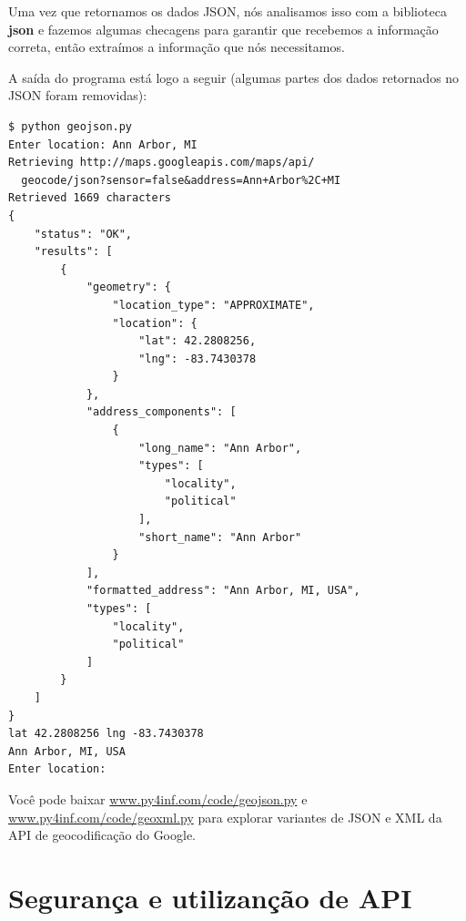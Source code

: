 Uma vez que retornamos os dados JSON, nós analisamos isso com a 
biblioteca {\bf json} e fazemos algumas checagens para garantir que 
recebemos a informação correta, então extraímos a informação que 
nós necessitamos.

A saída do programa está logo a seguir (algumas partes dos dados retornados
no JSON foram removidas):

\beforeverb
\begin{verbatim}
$ python geojson.py
Enter location: Ann Arbor, MI
Retrieving http://maps.googleapis.com/maps/api/
  geocode/json?sensor=false&address=Ann+Arbor%2C+MI
Retrieved 1669 characters
{
    "status": "OK", 
    "results": [
        {
            "geometry": {
                "location_type": "APPROXIMATE", 
                "location": {
                    "lat": 42.2808256, 
                    "lng": -83.7430378
                }
            }, 
            "address_components": [
                {
                    "long_name": "Ann Arbor", 
                    "types": [
                        "locality", 
                        "political"
                    ], 
                    "short_name": "Ann Arbor"
                } 
            ], 
            "formatted_address": "Ann Arbor, MI, USA", 
            "types": [
                "locality", 
                "political"
            ]
        }
    ]
}
lat 42.2808256 lng -83.7430378
Ann Arbor, MI, USA
Enter location:
\end{verbatim}
\afterverb
%
Você pode baixar
\url{www.py4inf.com/code/geojson.py} e
\url{www.py4inf.com/code/geoxml.py} para explorar
variantes de JSON e XML da API de geocodificação do Google.

\section{Segurança e utilizanção de API}

